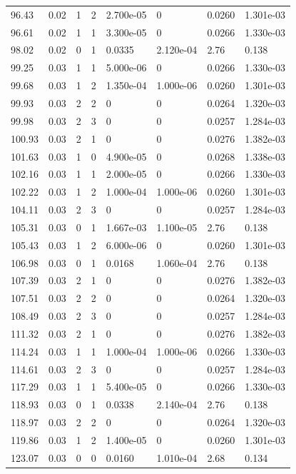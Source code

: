 \documentclass[preview]{standalone}
\begin{document}
{{{\begin{tabular}{L{1.2cm}C{1.2cm} C{0.3cm}C{0.5cm} C{1.4cm}C{1.4cm} C{1.4cm}C{1.4cm}}
  96.43  &  0.02  & 1     &  2 &  2.700e-05  & 0  & 0.0260 &  1.301e-03   \\ 
  96.61  &  0.02  & 1     &  1 &  3.300e-05  & 0  & 0.0266 &  1.330e-03   \\ 
  98.02  &  0.02  & 0     &  1 &  0.0335  & 2.120e-04  & 2.76 &  0.138   \\ 
  99.25  &  0.03  & 1     &  1 &  5.000e-06  & 0  & 0.0266 &  1.330e-03   \\ 
  99.68  &  0.03  & 1     &  2 &  1.350e-04  & 1.000e-06  & 0.0260 &  1.301e-03   \\ 
  99.93  &  0.03  & 2     &  2 &  0  & 0  & 0.0264 &  1.320e-03   \\ 
  99.98  &  0.03  & 2     &  3 &  0  & 0  & 0.0257 &  1.284e-03   \\ 
  100.93  &  0.03  & 2     &  1 &  0  & 0  & 0.0276 &  1.382e-03   \\ 
  101.63  &  0.03  & 1     &  0 &  4.900e-05  & 0  & 0.0268 &  1.338e-03   \\ 
  102.16  &  0.03  & 1     &  1 &  2.000e-05  & 0  & 0.0266 &  1.330e-03   \\ 
  102.22  &  0.03  & 1     &  2 &  1.000e-04  & 1.000e-06  & 0.0260 &  1.301e-03   \\ 
  104.11  &  0.03  & 2     &  3 &  0  & 0  & 0.0257 &  1.284e-03   \\ 
  105.31  &  0.03  & 0     &  1 &  1.667e-03  & 1.100e-05  & 2.76 &  0.138   \\ 
  105.43  &  0.03  & 1     &  2 &  6.000e-06  & 0  & 0.0260 &  1.301e-03   \\ 
  106.98  &  0.03  & 0     &  1 &  0.0168  & 1.060e-04  & 2.76 &  0.138   \\ 
  107.39  &  0.03  & 2     &  1 &  0  & 0  & 0.0276 &  1.382e-03   \\ 
  107.51  &  0.03  & 2     &  2 &  0  & 0  & 0.0264 &  1.320e-03   \\ 
  108.49  &  0.03  & 2     &  3 &  0  & 0  & 0.0257 &  1.284e-03   \\ 
  111.32  &  0.03  & 2     &  1 &  0  & 0  & 0.0276 &  1.382e-03   \\ 
  114.24  &  0.03  & 1     &  1 &  1.000e-04  & 1.000e-06  & 0.0266 &  1.330e-03   \\ 
  114.61  &  0.03  & 2     &  3 &  0  & 0  & 0.0257 &  1.284e-03   \\ 
  117.29  &  0.03  & 1     &  1 &  5.400e-05  & 0  & 0.0266 &  1.330e-03   \\ 
  118.93  &  0.03  & 0     &  1 &  0.0338  & 2.140e-04  & 2.76 &  0.138   \\ 
  118.97  &  0.03  & 2     &  2 &  0  & 0  & 0.0264 &  1.320e-03   \\ 
  119.86  &  0.03  & 1     &  2 &  1.400e-05  & 0  & 0.0260 &  1.301e-03   \\ 
  123.07  &  0.03  & 0     &  0 &  0.0160  & 1.010e-04  & 2.68 &  0.134   \\ 
\hline 
\end{tabular} 

}}}
\end{document}
